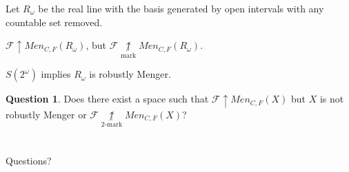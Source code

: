 \documentclass{beamer}
\theoremstyle{example}
\theoremstyle{definition}
\newtheorem{question}[theorem]{Question}
\newcommand{\win}{\uparrow}
\newcommand{\notmarkwin}{\underset{\text{mark}}{\not\uparrow}}
\newcommand{\notkmarkwin}[1]{\underset{#1\text{-mark}}{\not\uparrow}}
\newcommand{\menGame}[1]{Men_{C,F}\left({#1}\right)}
\newcommand{\<}{\langle}
\renewcommand{\>}{\rangle}
\newcommand{\alcompS}[1]{S(#1)}
\newcommand{\pl}[1]{\mathscr{#1}}
\begin{document}
\begin{frame}
  \begin{example}
    Let \(R_{\omega}\) be the real line with the basis generated by
    open intervals with any countable set removed.
  \end{example}

  \pause

  \begin{theorem}
    \(\pl F\win\menGame{R_\omega}\), but
    \(\pl F\notmarkwin\menGame{R_\omega}\).
  \end{theorem}

  \pause

  \begin{theorem}
    \(\alcompS{2^\omega}\) implies \(R_\omega\) is robustly Menger.
  \end{theorem}

  \pause

  \begin{question}
    Does there exist a space such that \(\pl F\win\menGame{X}\)
    but \(X\) is not robustly Menger or \(\pl F\notkmarkwin{2}\menGame{X}\)?
  \end{question}
\end{frame}

\section*{}

\begin{frame}[allowframebreaks]
  \tiny
  
  
\end{frame}

\begin{frame}
  Questions?
\end{frame}
\end{document}
